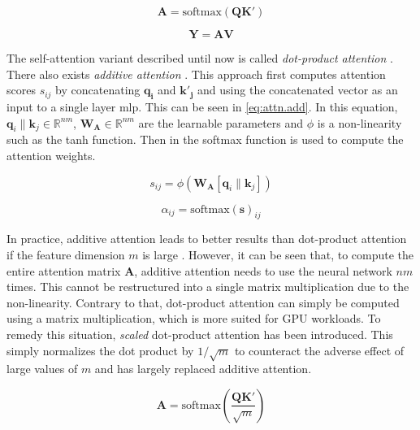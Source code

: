 \begin{equation}
        \label{eq:attn.kqv}
        \mathbf{A} = \text{softmax}(\mathbf{Q}\mathbf{K}')
\end{equation}

\begin{equation}
        \label{eq:attn.res.kqv}
        \mathbf{Y} = \mathbf{A} \mathbf{V}
\end{equation}

The self-attention variant described until now is called \emph{dot-product attention} \citep{DBLP:conf/emnlp/LuongPM15,DBLP:journals/corr/GravesWD14}. There also exists \emph{additive attention} \citep{DBLP:journals/corr/BahdanauCB14}. This approach first computes attention scores $s_{ij}$ by concatenating $\mathbf{q_i}$ and $\mathbf{k'_j}$ and using the concatenated vector as an input to a single layer \gls{mlp}. This can be seen in \autoref{eq:attn.add}. In this equation, $\mathbf{q}_i \| \mathbf{k}_j\in \mathbb{R}^{nm}$, $\mathbf{W_A}\in \mathbb{R}^{nm}$ are the learnable parameters and $\phi$ is a non-linearity such as the tanh function. Then in  the softmax function is used to compute the attention weights.

\begin{equation}
        \label{eq:attn.add}
        s_{ij} = \phi(\mathbf{W_A}[\mathbf{q}_i \| \mathbf{k}_j])
\end{equation}

\begin{equation}
        \label{eq:attn.add.soft}
        \alpha_{ij}=\text{softmax}(\mathbf{s})_{ij}
\end{equation}

In practice, additive attention leads to better results than dot-product attention if the feature dimension $m$ is large \citep{britz-etal-2017-massive}. However, it can be seen that, to compute the entire attention matrix $\mathbf{A}$, additive
attention needs to use the neural network $nm$ times. This cannot be restructured into a single matrix multiplication due to the non-linearity. Contrary to that, dot-product attention can simply be computed using a matrix multiplication, which is more suited for GPU workloads. To remedy this situation, \emph{scaled} dot-product attention \citep{DBLP:conf/nips/VaswaniSPUJGKP17} has been introduced. This simply normalizes the dot product by $1/\sqrt{m}$ to counteract the adverse effect of large values of $m$ and has largely replaced additive attention.

\begin{equation}
        \label{eq:attn.scal.kqv}
        \mathbf{A} = \text{softmax}\left(\frac{\mathbf{Q}\mathbf{K}'}{\sqrt{m}}\right)
\end{equation}

